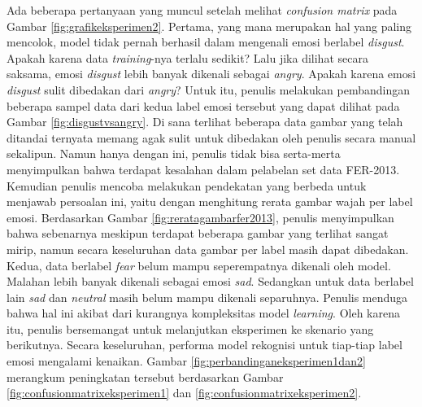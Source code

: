 Ada beberapa pertanyaan yang muncul setelah melihat \textit{confusion matrix} pada Gambar \ref{fig:grafikeksperimen2}. Pertama, yang mana merupakan hal yang paling mencolok, model tidak pernah berhasil dalam mengenali emosi berlabel \textit{disgust}. Apakah karena data \textit{training}-nya terlalu sedikit? Lalu jika dilihat secara saksama, emosi \textit{disgust} lebih banyak dikenali sebagai \textit{angry}. Apakah karena emosi \textit{disgust} sulit dibedakan dari \textit{angry}? Untuk itu, penulis melakukan pembandingan beberapa sampel data dari kedua label emosi tersebut yang dapat dilihat pada Gambar \ref{fig:disgustvsangry}. Di sana terlihat beberapa data gambar yang telah ditandai ternyata memang agak sulit untuk dibedakan oleh penulis secara manual sekalipun. Namun hanya dengan ini, penulis tidak bisa serta-merta menyimpulkan bahwa terdapat kesalahan dalam pelabelan set data FER-2013. Kemudian penulis mencoba melakukan pendekatan yang berbeda untuk menjawab persoalan ini, yaitu dengan menghitung rerata gambar wajah per label emosi. Berdasarkan Gambar \ref{fig:reratagambarfer2013}, penulis menyimpulkan bahwa sebenarnya meskipun terdapat beberapa gambar yang terlihat sangat mirip, namun secara keseluruhan data gambar per label masih dapat dibedakan. Kedua, data berlabel \textit{fear} belum mampu seperempatnya dikenali oleh model. Malahan lebih banyak dikenali sebagai emosi \textit{sad}. Sedangkan untuk data berlabel lain \textit{sad} dan \textit{neutral} masih belum mampu dikenali separuhnya. Penulis menduga bahwa hal ini akibat dari kurangnya kompleksitas model \textit{learning}. Oleh karena itu, penulis bersemangat untuk melanjutkan eksperimen ke skenario yang berikutnya. Secara keseluruhan, performa model rekognisi untuk tiap-tiap label emosi mengalami kenaikan. Gambar \ref{fig:perbandinganeksperimen1dan2} merangkum peningkatan tersebut berdasarkan Gambar \ref{fig:confusionmatrixeksperimen1} dan \ref{fig:confusionmatrixeksperimen2}.

